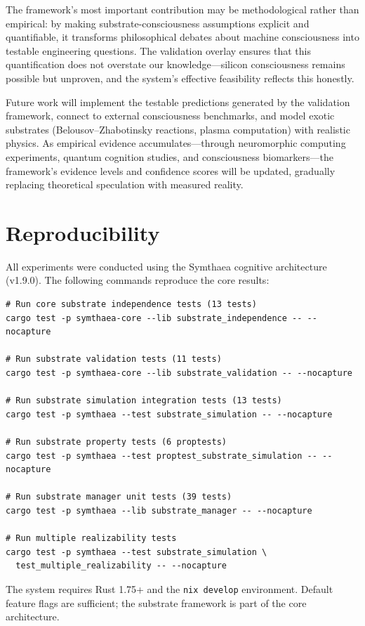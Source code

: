 \documentclass[12pt,a4paper]{article}
\begin{document}
The framework's most important contribution may be methodological rather than empirical: by making substrate-consciousness assumptions explicit and quantifiable, it transforms philosophical debates about machine consciousness into testable engineering questions. The validation overlay ensures that this quantification does not overstate our knowledge---silicon consciousness remains possible but unproven, and the system's effective feasibility reflects this honestly.

Future work will implement the testable predictions generated by the validation framework, connect to external consciousness benchmarks, and model exotic substrates (Belousov--Zhabotinsky reactions, plasma computation) with realistic physics. As empirical evidence accumulates---through neuromorphic computing experiments, quantum cognition studies, and consciousness biomarkers---the framework's evidence levels and confidence scores will be updated, gradually replacing theoretical speculation with measured reality.

\section{Reproducibility}

All experiments were conducted using the Symthaea cognitive architecture (v1.9.0). The following commands reproduce the core results:

\begin{verbatim}
# Run core substrate independence tests (13 tests)
cargo test -p symthaea-core --lib substrate_independence -- --nocapture

# Run substrate validation tests (11 tests)
cargo test -p symthaea-core --lib substrate_validation -- --nocapture

# Run substrate simulation integration tests (13 tests)
cargo test -p symthaea --test substrate_simulation -- --nocapture

# Run substrate property tests (6 proptests)
cargo test -p symthaea --test proptest_substrate_simulation -- --nocapture

# Run substrate manager unit tests (39 tests)
cargo test -p symthaea --lib substrate_manager -- --nocapture

# Run multiple realizability tests
cargo test -p symthaea --test substrate_simulation \
  test_multiple_realizability -- --nocapture
\end{verbatim}

The system requires Rust 1.75+ and the \texttt{nix develop} environment. Default feature flags are sufficient; the substrate framework is part of the core architecture.
\end{document}

